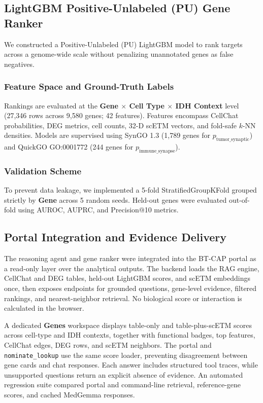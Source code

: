 \documentclass[conference]{IEEEtran}
\begin{document}
\subsection{LightGBM Positive-Unlabeled (PU) Gene Ranker}
We constructed a Positive-Unlabeled (PU) LightGBM model to rank targets across a genome-wide scale without penalizing unannotated genes as false negatives.

\subsubsection{Feature Space and Ground-Truth Labels}
Rankings are evaluated at the \textbf{Gene $\times$ Cell Type $\times$ IDH Context} level (27,346 rows across 9,580 genes; 42 features). Features encompass CellChat probabilities, DEG metrics, cell counts, 32-D scETM vectors, and fold-safe $k$-NN densities. Models are supervised using SynGO 1.3 (1,789 genes for $p_{\text{tumor\_synaptic}}$) and QuickGO GO:0001772 (244 genes for $p_{\text{immune\_synapse}}$).

\subsubsection{Validation Scheme}
To prevent data leakage, we implemented a 5-fold StratifiedGroupKFold grouped strictly by \textbf{Gene} across 5 random seeds. Held-out genes were evaluated out-of-fold using AUROC, AUPRC, and Precision@10 metrics.

\subsection{Portal Integration and Evidence Delivery}
The reasoning agent and gene ranker were integrated into the BT-CAP portal as a read-only layer over the analytical outputs. The backend loads the RAG engine, CellChat and DEG tables, held-out LightGBM scores, and scETM embeddings once, then exposes endpoints for grounded questions, gene-level evidence, filtered rankings, and nearest-neighbor retrieval. No biological score or interaction is calculated in the browser.

A dedicated \textbf{Genes} workspace displays table-only and table-plus-scETM scores across cell-type and IDH contexts, together with functional badges, top features, CellChat edges, DEG rows, and scETM neighbors. The portal and \texttt{nominate\_lookup} use the same score loader, preventing disagreement between gene cards and chat responses. Each answer includes structured tool traces, while unsupported questions return an explicit absence of evidence. An automated regression suite compared portal and command-line retrieval, reference-gene scores, and cached MedGemma responses.
\end{document}
